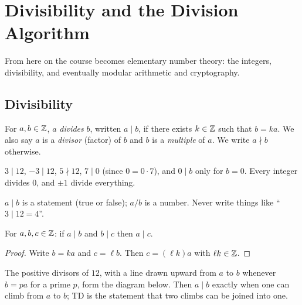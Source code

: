 \chapter{Divisibility and the Division Algorithm}

From here on the course becomes elementary number theory: the integers, divisibility, and
eventually modular arithmetic and cryptography.

\section{Divisibility}

\begin{definition}
For $a, b \in \mathbb{Z}$, $a$ \emph{divides} $b$, written $a \mid b$, if there exists $k \in \mathbb{Z}$ such
that $b = ka$. We also say $a$ is a \emph{divisor} (factor) of $b$ and $b$ is a
\emph{multiple} of $a$. We write $a \nmid b$ otherwise.
\end{definition}

\begin{example}
$3 \mid 12$, $-3 \mid 12$, $5 \nmid 12$, $7 \mid 0$ (since $0 = 0\cdot 7$), and $0 \mid b$ only
for $b = 0$. Every integer divides $0$, and $\pm1$ divide everything.
\end{example}

\begin{important}
$a \mid b$ is a statement (true or false); $a / b$ is a number. Never write things like
``$3 \mid 12 = 4$''.
\end{important}

\begin{proposition}
For $a,b,c\in\mathbb{Z}$: if $a \mid b$ and $b \mid c$ then $a \mid c$.
\end{proposition}
\begin{proof}
Write $b = ka$ and $c = \ell b$. Then $c = (\ell k) a$ with $\ell k \in \mathbb{Z}$.
\end{proof}

The positive divisors of $12$, with a line drawn upward from $a$ to $b$ whenever $b = pa$ for
a prime $p$, form the diagram below. Then $a \mid b$ exactly when one can climb from $a$ to $b$;
TD is the statement that two climbs can be joined into one.
\begin{center}
\end{center}

